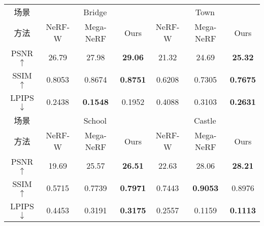 \begin{table}[p]
{\begin{tabular}{ccccccc}
场景    & \multicolumn{3}{c}{Bridge}                  & \multicolumn{3}{c}{Town}                   \\ \cline{2-7} 
方法    & NeRF-W  & Mega-NeRF       & Ours            & NeRF-W & Mega-NeRF       & Ours            \\ \hline
PSNR $\uparrow$  & 26.79   & 27.98           & \textbf{29.06}  & 21.32  & 24.69           & \textbf{25.32}  \\
SSIM $\uparrow$  & 0.8053  & 0.8674          & \textbf{0.8751} & 0.6208 & 0.7305          & \textbf{0.7675} \\
LPIPS $\downarrow$ & 0.2438  & \textbf{0.1548} & 0.1952          & 0.4088 & 0.3103          & \textbf{0.2631} \\ \hline
场景    & \multicolumn{3}{c}{School}                  & \multicolumn{3}{c}{Castle}                 \\ \cline{2-7} 
方法    & NeRF-W  & Mega-NeRF       & Ours            & NeRF-W & Mega-NeRF       & Ours            \\ \hline
PSNR $\uparrow$  & 19.69   & 25.57           & \textbf{26.51}  & 22.63  & 28.06           & \textbf{28.21}  \\
SSIM $\uparrow$  & 0.5715  & 0.7739          & \textbf{0.7971} & 0.7443 & \textbf{0.9053} & 0.8976          \\
LPIPS $\downarrow$ & 0.4453 & 0.3191          & \textbf{0.3175} & 0.2557 & 0.1159          & \textbf{0.1113} \\ \hline
\end{tabular}%
}
\end{table}